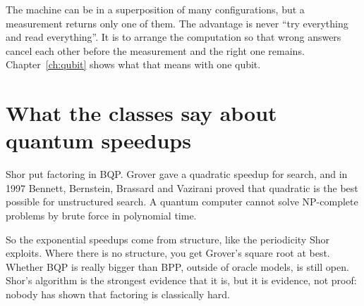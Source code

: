 The machine can be in a superposition of many configurations, but a measurement
returns only one of them. The advantage is never ``try everything and read
everything''. It is to arrange the computation so that wrong answers cancel each
other before the measurement and the right one remains. Chapter~\ref{ch:qubit}
shows what that means with one qubit.

\section{What the classes say about quantum speedups}

Shor put factoring in BQP. Grover gave a quadratic speedup for search, and in
1997 Bennett, Bernstein, Brassard and Vazirani proved that quadratic is the best
possible for unstructured search. A quantum computer cannot solve NP-complete
problems by brute force in polynomial time.

So the exponential speedups come from structure, like the periodicity Shor
exploits. Where there is no structure, you get Grover's square root at best.
Whether BQP is really bigger than BPP, outside of oracle models, is still open.
Shor's algorithm is the strongest evidence that it is, but it is evidence, not
proof: nobody has shown that factoring is classically hard.

